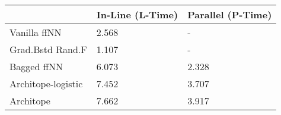 \begin{tabular}{lll}
\toprule
{} & In-Line (L-Time) & Parallel (P-Time) \\
\midrule
Vanilla ffNN       &            2.568 &                 - \\
Grad.Bstd Rand.F   &            1.107 &                 - \\
Bagged ffNN        &            6.073 &             2.328 \\
Architope-logistic &            7.452 &             3.707 \\
Architope          &            7.662 &             3.917 \\
\bottomrule
\end{tabular}
